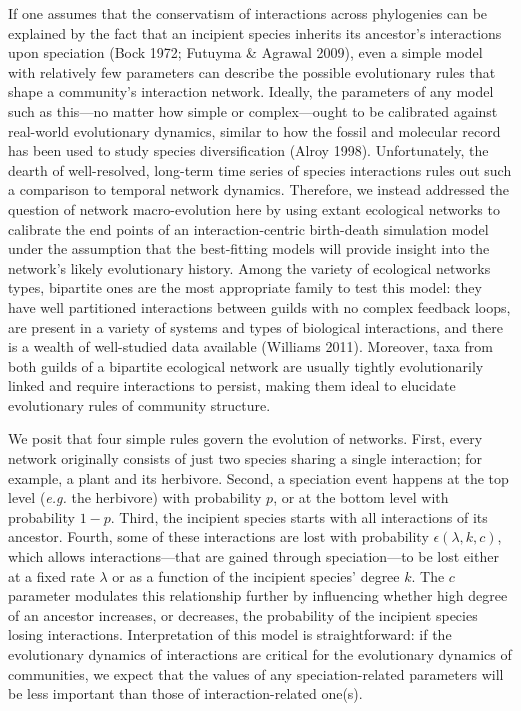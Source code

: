 \documentclass[12pt]{article}
\begin{document}
If one assumes that the conservatism of interactions across phylogenies
can be explained by the fact that an incipient species inherits its
ancestor's interactions upon speciation (Bock 1972; Futuyma \& Agrawal
2009), even a simple model with relatively few parameters can describe
the possible evolutionary rules that shape a community's interaction
network. Ideally, the parameters of any model such as this---no matter
how simple or complex---ought to be calibrated against real-world
evolutionary dynamics, similar to how the fossil and molecular record
has been used to study species diversification (Alroy 1998).
Unfortunately, the dearth of well-resolved, long-term time series of
species interactions rules out such a comparison to temporal network
dynamics. Therefore, we instead addressed the question of network
macro-evolution here by using extant ecological networks to calibrate
the end points of an interaction-centric birth-death simulation model
under the assumption that the best-fitting models will provide insight
into the network's likely evolutionary history. Among the variety of
ecological networks types, bipartite ones are the most appropriate
family to test this model: they have well partitioned interactions
between guilds with no complex feedback loops, are present in a variety
of systems and types of biological interactions, and there is a wealth
of well-studied data available (Williams 2011). Moreover, taxa from both
guilds of a bipartite ecological network are usually tightly
evolutionarily linked and require interactions to persist, making them
ideal to elucidate evolutionary rules of community structure.

We posit that four simple rules govern the evolution of networks. First,
every network originally consists of just two species sharing a single
interaction; for example, a plant and its herbivore. Second, a
speciation event happens at the top level (\emph{e.g.} the herbivore)
with probability \(p\), or at the bottom level with probability \(1-p\).
Third, the incipient species starts with all interactions of its
ancestor. Fourth, some of these interactions are lost with probability
\(\epsilon(\lambda, k, c)\), which allows interactions---that are gained
through speciation---to be lost either at a fixed rate \(\lambda\) or as
a function of the incipient species' degree \(k\). The \(c\) parameter
modulates this relationship further by influencing whether high degree
of an ancestor increases, or decreases, the probability of the incipient
species losing interactions. Interpretation of this model is
straightforward: if the evolutionary dynamics of interactions are
critical for the evolutionary dynamics of communities, we expect that
the values of any speciation-related parameters will be less important
than those of interaction-related one(s).
\end{document}
